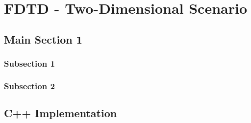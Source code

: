 
\chapter{FDTD - Two-Dimensional Scenario} %

\label{Chapter3} %


\section{Main Section 1}

\subsection{Subsection 1}

\subsection{Subsection 2}

\section{C++ Implementation}

